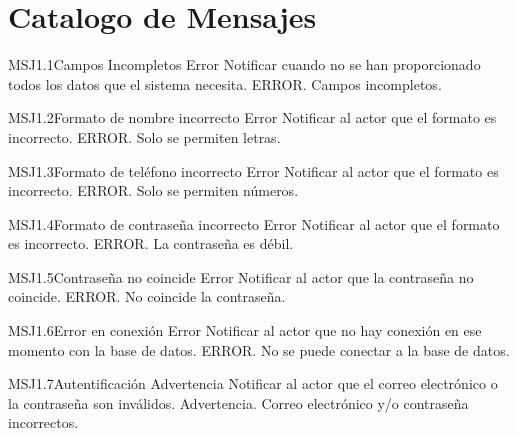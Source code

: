 \section{Catalogo de Mensajes}

	\begin{Message}{MSJ1.1}{Campos Incompletos}
		\MSGitem[Tipo:] Error
		\MSGitem[Objetivo: ] Notificar cuando no se han proporcionado todos los datos que el sistema necesita.
		\MSGitem[Redacción: ] ERROR. Campos incompletos.
	\end{Message}

	\begin{Message}{MSJ1.2}{Formato de nombre incorrecto}
		\MSGitem[Tipo:] Error
		\MSGitem[Objetivo: ] Notificar al actor que el formato es incorrecto.
		\MSGitem[Redacción: ] ERROR. Solo se permiten letras.
	\end{Message}

		\begin{Message}{MSJ1.3}{Formato de teléfono incorrecto}
		\MSGitem[Tipo:] Error
		\MSGitem[Objetivo: ] Notificar al actor que el formato es incorrecto.
		\MSGitem[Redacción: ] ERROR. Solo se permiten números.
	\end{Message}

	\begin{Message}{MSJ1.4}{Formato de contraseña incorrecto}
		\MSGitem[Tipo:] Error
		\MSGitem[Objetivo: ] Notificar al actor que el formato es incorrecto.
		\MSGitem[Redacción: ] ERROR. La contraseña es débil.
	\end{Message}

	\begin{Message}{MSJ1.5}{Contraseña no coincide}
		\MSGitem[Tipo:] Error
		\MSGitem[Objetivo: ] Notificar al actor que la contraseña no coincide.
		\MSGitem[Redacción: ] ERROR. No coincide la contraseña.
		\end{Message}

	\begin{Message}{MSJ1.6}{Error en conexión}
		\MSGitem[Tipo:] Error
		\MSGitem[Objetivo: ] Notificar al actor que no hay conexión en ese momento con la base de datos.
		\MSGitem[Redacción: ] ERROR. No se puede conectar a la base de datos.
	\end{Message}

	\begin{Message}{MSJ1.7}{Autentificación}
		\MSGitem[Tipo:] Advertencia
		\MSGitem[Objetivo: ] Notificar al actor que el correo electrónico o la contraseña son inválidos.
		\MSGitem[Redacción: ] Advertencia. Correo electrónico y/o contraseña incorrectos.
	\end{Message}

